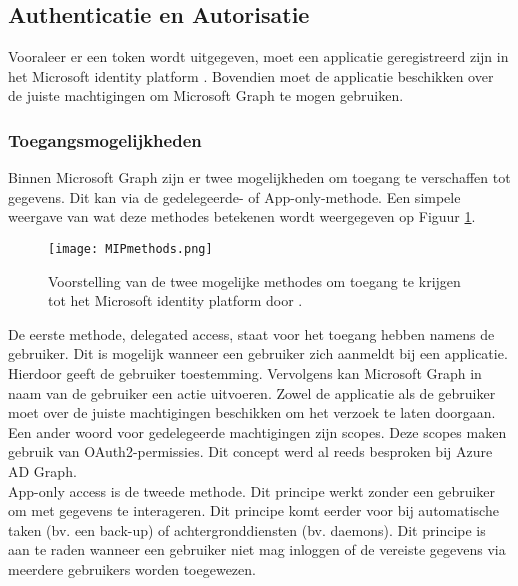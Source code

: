 \subsection{Authenticatie en Autorisatie}

Vooraleer er een token wordt uitgegeven, moet een applicatie geregistreerd zijn in het Microsoft identity platform \autocite{Microsoft2022b}. Bovendien moet de applicatie beschikken over de juiste machtigingen om Microsoft Graph te mogen gebruiken. \\

\subsubsection{Toegangsmogelijkheden}

Binnen Microsoft Graph zijn er twee mogelijkheden om toegang te verschaffen tot gegevens. Dit kan via de gedelegeerde- of App-only-methode. Een simpele weergave van wat deze methodes betekenen wordt weergegeven op Figuur \ref{MIPM}. \\

\begin{figure}[h]
    \texttt{[image: MIPmethods.png]}
    \caption[Voorbeeld toegangsmogelijkheden]{Voorstelling van de twee mogelijke methodes om toegang te krijgen tot het Microsoft identity platform door \autocite{Microsoft2022b}.}
    \label{MIPM}
\end{figure}

De eerste methode, delegated access, staat voor het toegang hebben namens de gebruiker. Dit is mogelijk wanneer een gebruiker zich aanmeldt bij een applicatie. Hierdoor geeft de gebruiker toestemming. Vervolgens kan Microsoft Graph in naam van de gebruiker een actie uitvoeren. Zowel de applicatie als de gebruiker moet over de juiste machtigingen beschikken om het verzoek te laten doorgaan. \\

Een ander woord voor gedelegeerde machtigingen zijn scopes. Deze scopes maken gebruik van OAuth2-permissies. Dit concept werd al reeds besproken bij Azure \ac{AD} Graph. \\

App-only access is de tweede methode. Dit principe werkt zonder een gebruiker om met gegevens te interageren. Dit principe komt eerder voor bij automatische taken (bv. een back-up) of achtergronddiensten (bv. daemons). Dit principe is aan te raden wanneer een gebruiker niet mag inloggen of de vereiste gegevens via meerdere gebruikers worden toegewezen. \\

